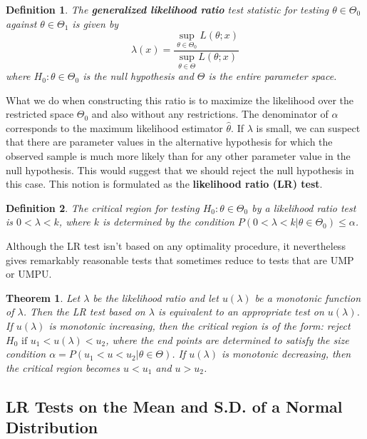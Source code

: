 \documentclass{article}
\newtheorem{definition}{Definition}[section]
\newtheorem{theorem}{Theorem}[section]
\begin{document}
\begin{definition}
    The \textbf{generalized likelihood ratio} test statistic for testing \(\theta \in \Theta_0\) against \(\theta \in \Theta_1\) is given by
    \begin{equation*}
        \lambda(x)=\frac{\sup_{\theta \in \Theta_0} L(\theta;x)}{\sup_{\theta \in \Theta} L(\theta;x)}
    \end{equation*}
    where \(H_0:\theta \in \Theta_0\) is the null hypothesis and \(\Theta\) is the entire parameter space.
\end{definition}

What we do when constructing this ratio is to maximize the likelihood over the restricted space $\Theta_0$ and also without any restrictions. The denominator of \(\alpha\) corresponds to the maximum likelihood estimator \(\hat{\theta}\). If \(\lambda\) is small, we can suspect that there are parameter values in the alternative hypothesis for which the observed sample is much more likely than for any other parameter value in the null hypothesis. This would suggest that we should reject the null hypothesis in this case. This notion is formulated as the \textbf{likelihood ratio (LR) test}.

\begin{definition}
    The critical region for testing \(H_0:\theta \in \Theta_0\) by a likelihood ratio test is \(0<\lambda<k\), where \(k\) is determined by the condition \(P(0<\lambda<k|\theta \in \Theta_0) \leq \alpha\).
\end{definition}

Although the LR test isn't based on any optimality procedure, it nevertheless gives remarkably reasonable tests that sometimes reduce to tests that are UMP or UMPU.

\begin{theorem}
    Let \(\lambda\) be the likelihood ratio and let \(u(\lambda)\) be a monotonic function of \(\lambda\). Then the LR test based on \(\lambda\) is equivalent to an appropriate test on \(u(\lambda)\). If \(u(\lambda)\) is monotonic increasing, then the critical region is of the form: reject \(H_0 \text{ if } u_1<u(\lambda)<u_2\), where the end points are determined to satisfy the size condition \(\alpha=P(u_1<u<u_2|\theta \in \Theta)\). If \(u(\lambda)\) is monotonic decreasing, then the critical region becomes \(u<u_1\) and \(u>u_2\).
\end{theorem}

\subsection{LR Tests on the Mean and S.D. of a Normal Distribution}
\end{document}
